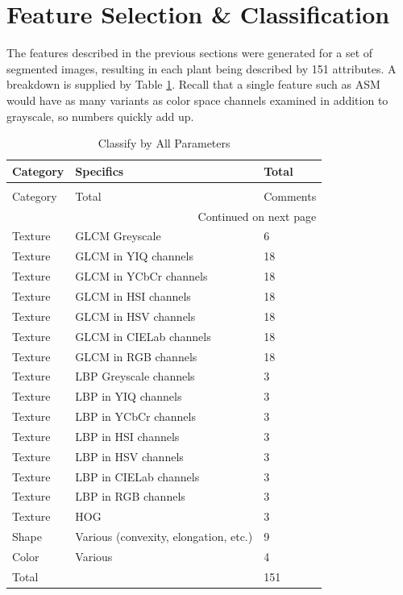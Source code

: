 \documentclass[letterpaper]{report}
\begin{document}
\section{Feature Selection \& Classification}
The features described in the previous sections were generated for a set of segmented images, resulting in each plant being described by 151 attributes. A breakdown is supplied by Table \ref{table:parameters}. Recall that a single feature such as ASM would have as many variants as color space channels examined in addition to grayscale, so numbers quickly add up. 
\begin{longtable}{lll}
\caption[Parameters Considered for Classification]{Parameters Considered for Classification}
\label{table:parameters}\\
\toprule
   Category &  Specifics & Total\\
\midrule
\endfirsthead
\caption[]{Classify by All Parameters} \\
\toprule
   Category &  Total & Comments\\
\midrule
\endhead
\midrule
\multicolumn{3}{r}{{Continued on next page}} \\
\midrule
\endfoot

\bottomrule
\endlastfoot
Texture & GLCM Greyscale & 6 \\
Texture & GLCM in YIQ channels & 18 \\
Texture & GLCM in YCbCr channels& 18 \\
Texture & GLCM in HSI channels& 18 \\
Texture & GLCM in HSV channels& 18\\
Texture & GLCM in CIELab channels& 18 \\
Texture & GLCM in RGB channels& 18 \\
Texture & LBP Greyscale channels& 3 \\
Texture & LBP in YIQ channels& 3 \\
Texture & LBP in YCbCr channels& 3 \\
Texture & LBP in HSI channels& 3 \\
Texture & LBP in HSV channels& 3 \\
Texture & LBP in CIELab channels& 3 \\
Texture & LBP in RGB channels& 3 \\
Texture & HOG & 3 \\
Shape & Various (convexity, elongation, etc.) & 9 \\
Color & Various & 4 \\
\midrule
Total& & 151\\
\bottomrule
\end{longtable}
\end{document}
